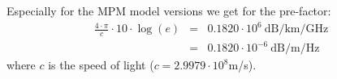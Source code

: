Especially for the MPM model versions
\citep{liebeandlayton:87,liebe:89,liebeetal:93} 
we get for the pre-factor:
\begin{eqnarray}
   \frac{4\cdot\pi}{c} \cdot 10 \cdot \log(e) &=& 0.1820 \cdot 10^{6}~\mbox{dB/km/GHz}\\
                                              &=& 0.1820 \cdot 10^{-6}~\mbox{dB/m/Hz}
\end{eqnarray}
where $c$ is the speed of light ($c=2.9979\cdot 10^{8}$m/s).




